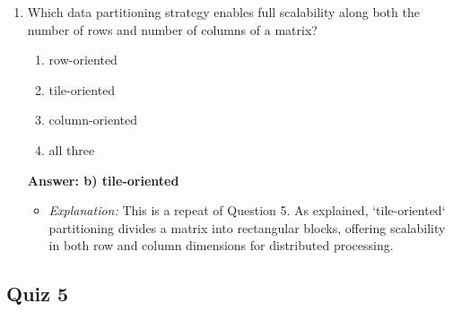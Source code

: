\documentclass{article}
\begin{document}
\begin{enumerate}[label=\textbf{Question \arabic*.}]
    \item Which data partitioning strategy enables full scalability along both the number of rows and number of columns of a matrix?
        \begin{enumerate}[label=\alph*)]
            \item row-oriented
            \item tile-oriented
            \item column-oriented
            \item all three
        \end{enumerate}
        \textbf{Answer: b) tile-oriented}
        \begin{itemize}
            \item \textit{Explanation:} This is a repeat of Question 5. As explained, `tile-oriented` partitioning divides a matrix into rectangular blocks, offering scalability in both row and column dimensions for distributed processing.
        \end{itemize}
    
    \end{enumerate}

\subsection*{Quiz 5}
\end{document}
